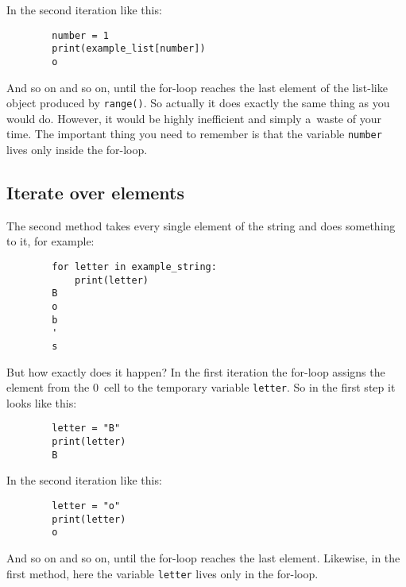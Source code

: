 \documentclass{article}
\begin{document}
\noindent In the second iteration like this:

\begin{center}
    \begin{verbatim}
        number = 1
        print(example_list[number])
        o
    \end{verbatim}
\end{center}

\noindent And so on and so on, until the for-loop reaches the last element of the list-like object produced by \texttt{range()}. So actually it does exactly the same thing as you would do. However, it would be highly inefficient and simply a~waste of your time. The important thing you need to remember is that the variable \texttt{number} lives only inside the for-loop.

\subsection*{Iterate over elements}
The second method takes every single element of the string and does something to it, for example:
\begin{center}
    \begin{verbatim}
        for letter in example_string:
            print(letter)
        B
        o
        b
        '
        s
    \end{verbatim}
\end{center}
\noindent But how exactly does it happen? In the first iteration the for-loop assigns the element from the 0~cell to the temporary variable \texttt{letter}. So in the first step it looks like this:

\begin{center}
    \begin{verbatim}
        letter = "B"
        print(letter)
        B
    \end{verbatim}
\end{center}
\noindent In the second iteration like this:
\begin{center}
    \begin{verbatim}
        letter = "o"
        print(letter)
        o
    \end{verbatim}
\end{center}
\noindent And so on and so on, until the for-loop reaches the last element. Likewise, in the first method, here the variable \texttt{letter} lives only in the for-loop.
\end{document}
